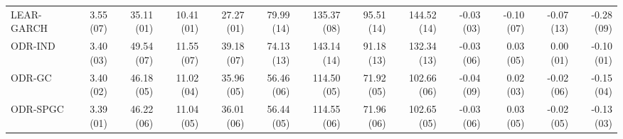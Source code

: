 \begin{tabular}{lrrrrrrrrrrrr}
LEAR-GARCH & {\cellcolor[HTML]{DAC9C9}} \color[HTML]{000000} 3.55 (07) & {\cellcolor[HTML]{008080}} \color[HTML]{F1F1F1} 35.11 (01) & {\cellcolor[HTML]{008080}} \color[HTML]{F1F1F1} 10.41 (01) & {\cellcolor[HTML]{008080}} \color[HTML]{F1F1F1} 27.27 (01) & {\cellcolor[HTML]{CD5F5F}} \color[HTML]{F1F1F1} 79.99 (14) & {\cellcolor[HTML]{D3D8D8}} \color[HTML]{000000} 135.37 (08) & {\cellcolor[HTML]{D17C7C}} \color[HTML]{F1F1F1} 95.51 (14) & {\cellcolor[HTML]{D38B8B}} \color[HTML]{F1F1F1} 144.52 (14) & {\cellcolor[HTML]{1D8C8C}} \color[HTML]{F1F1F1} -0.03 (03) & {\cellcolor[HTML]{D9C1C1}} \color[HTML]{000000} -0.10 (07) & {\cellcolor[HTML]{D7B1B1}} \color[HTML]{000000} -0.07 (13) & {\cellcolor[HTML]{D1D7D7}} \color[HTML]{000000} -0.28 (09) \\
ODR-IND & {\cellcolor[HTML]{138888}} \color[HTML]{F1F1F1} 3.40 (03) & {\cellcolor[HTML]{DCD8D8}} \color[HTML]{000000} 49.54 (07) & {\cellcolor[HTML]{7BB3B3}} \color[HTML]{F1F1F1} 11.55 (07) & {\cellcolor[HTML]{DCDBDB}} \color[HTML]{000000} 39.18 (07) & {\cellcolor[HTML]{D39393}} \color[HTML]{F1F1F1} 74.13 (13) & {\cellcolor[HTML]{D9C0C0}} \color[HTML]{000000} 143.14 (14) & {\cellcolor[HTML]{D59C9C}} \color[HTML]{F1F1F1} 91.18 (13) & {\cellcolor[HTML]{D8BBBB}} \color[HTML]{000000} 132.34 (13) & {\cellcolor[HTML]{379797}} \color[HTML]{F1F1F1} -0.03 (06) & {\cellcolor[HTML]{A9C7C7}} \color[HTML]{000000} 0.03 (05) & {\cellcolor[HTML]{008080}} \color[HTML]{F1F1F1} 0.00 (01) & {\cellcolor[HTML]{008080}} \color[HTML]{F1F1F1} -0.10 (01) \\
ODR-GC & {\cellcolor[HTML]{078383}} \color[HTML]{F1F1F1} 3.40 (02) & {\cellcolor[HTML]{B3CBCB}} \color[HTML]{000000} 46.18 (05) & {\cellcolor[HTML]{429B9B}} \color[HTML]{F1F1F1} 11.02 (04) & {\cellcolor[HTML]{A9C7C7}} \color[HTML]{000000} 35.96 (05) & {\cellcolor[HTML]{188A8A}} \color[HTML]{F1F1F1} 56.46 (06) & {\cellcolor[HTML]{269090}} \color[HTML]{F1F1F1} 114.50 (05) & {\cellcolor[HTML]{2D9393}} \color[HTML]{F1F1F1} 71.92 (05) & {\cellcolor[HTML]{238E8E}} \color[HTML]{F1F1F1} 102.66 (06) & {\cellcolor[HTML]{4CA0A0}} \color[HTML]{F1F1F1} -0.04 (09) & {\cellcolor[HTML]{70AFAF}} \color[HTML]{F1F1F1} 0.02 (03) & {\cellcolor[HTML]{CFD7D7}} \color[HTML]{000000} -0.02 (06) & {\cellcolor[HTML]{489E9E}} \color[HTML]{F1F1F1} -0.15 (04) \\
ODR-SPGC & {\cellcolor[HTML]{008080}} \color[HTML]{F1F1F1} 3.39 (01) & {\cellcolor[HTML]{B3CBCB}} \color[HTML]{000000} 46.22 (06) & {\cellcolor[HTML]{459D9D}} \color[HTML]{F1F1F1} 11.04 (05) & {\cellcolor[HTML]{A9C7C7}} \color[HTML]{000000} 36.01 (06) & {\cellcolor[HTML]{168989}} \color[HTML]{F1F1F1} 56.44 (05) & {\cellcolor[HTML]{269090}} \color[HTML]{F1F1F1} 114.55 (06) & {\cellcolor[HTML]{2F9393}} \color[HTML]{F1F1F1} 71.96 (06) & {\cellcolor[HTML]{238E8E}} \color[HTML]{F1F1F1} 102.65 (05) & {\cellcolor[HTML]{379797}} \color[HTML]{F1F1F1} -0.03 (06) & {\cellcolor[HTML]{A9C7C7}} \color[HTML]{000000} 0.03 (05) & {\cellcolor[HTML]{BACECE}} \color[HTML]{000000} -0.02 (05) & {\cellcolor[HTML]{399898}} \color[HTML]{F1F1F1} -0.13 (03) \\

\end{tabular}

